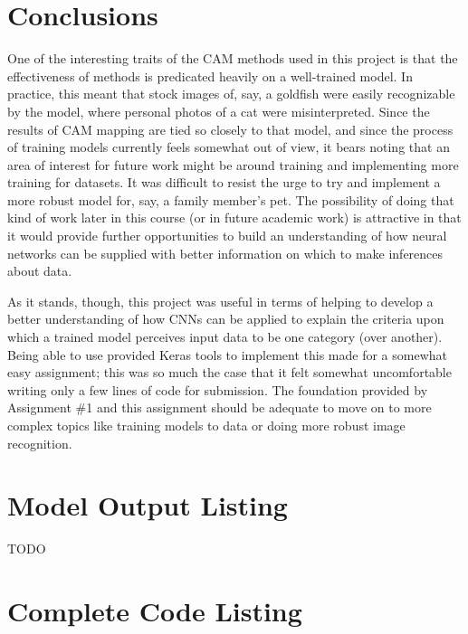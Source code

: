 \documentclass{article}
\begin{document}
\section{Conclusions}
One of the interesting traits of the CAM methods used in this project is that the effectiveness of methods is predicated heavily on a well-trained model.
In practice, this meant that stock images of, say, a goldfish were easily recognizable by the model, where personal photos of a cat were misinterpreted.
Since the results of CAM mapping are tied so closely to that model, and since the process of training models currently feels somewhat out of view, it bears noting that an area of interest for future work might be around training and implementing more training for datasets. It was difficult to resist the urge to try and implement a more robust model for, say, a family member's pet. 
The possibility of doing that kind of work later in this course (or in future academic work) is attractive in that it would provide further opportunities to build an understanding of how neural networks can be supplied with better information on which to make inferences about data.

\par As it stands, though, this project was useful in terms of helping to develop a better understanding of how CNNs can be applied to explain the criteria upon which a trained model perceives input data to be one category (over another).
Being able to use provided Keras tools to implement this made for a somewhat easy assignment; this was so much the case that it felt somewhat uncomfortable writing only a few lines of code for submission.
The foundation provided by Assignment \#1 and this assignment should be adequate to move on to more complex topics like training models to data or doing more robust image recognition.

\begin{appendices}

\newpage
\section{Model Output Listing} \label{modelouts}
TODO
\newpage
\section{Complete Code Listing} \label{codelist}

\end{appendices}


  
  
\end{document}
